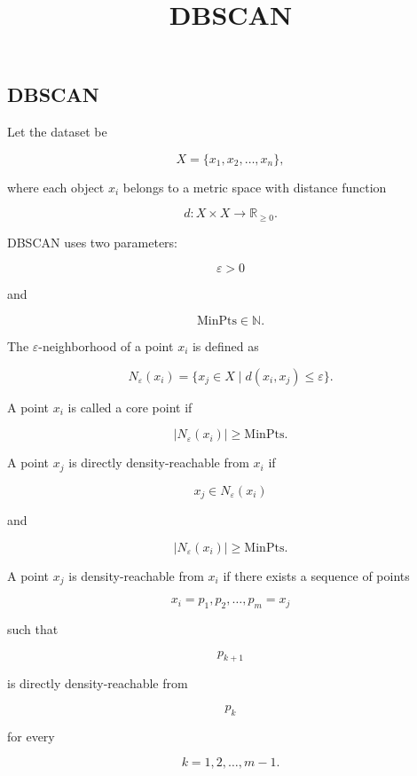 \documentclass[a4paper]{article}
\title{DBSCAN}
\date{}
\begin{document}
\maketitle

\subsection{DBSCAN}
    
    Let the dataset be
    
    \[
        X = \{x_1, x_2, \dots, x_n\},
    \]
    
    where each object \(x_i\) belongs to a metric space with distance function
    
    \[
        d : X \times X \rightarrow \mathbb{R}_{\geq 0}.
    \]
    
    DBSCAN uses two parameters:
    
    \[
        \varepsilon > 0
    \]
    
    and
    
    \[
        \mathrm{MinPts} \in \mathbb{N}.
    \]
    
    The \(\varepsilon\)-neighborhood of a point \(x_i\) is defined as
    
    \[
        N_{\varepsilon}(x_i)
        =
        \{x_j \in X \mid d(x_i, x_j) \leq \varepsilon\}.
    \]
    
    A point \(x_i\) is called a core point if
    
    \[
        |N_{\varepsilon}(x_i)| \geq \mathrm{MinPts}.
    \]
    
    A point \(x_j\) is directly density-reachable from \(x_i\) if
    
    \[
        x_j \in N_{\varepsilon}(x_i)
    \]
    
    and
    
    \[
        |N_{\varepsilon}(x_i)| \geq \mathrm{MinPts}.
    \]
    
    A point \(x_j\) is density-reachable from \(x_i\) if there exists a sequence of points
    
    \[
        x_i = p_1, p_2, \dots, p_m = x_j
    \]
    
    such that
    
    \[
        p_{k+1}
    \]
    
    is directly density-reachable from
    
    \[
        p_k
    \]
    
    for every
    
    \[
        k = 1, 2, \dots, m-1.
    \]
    
\end{document}

